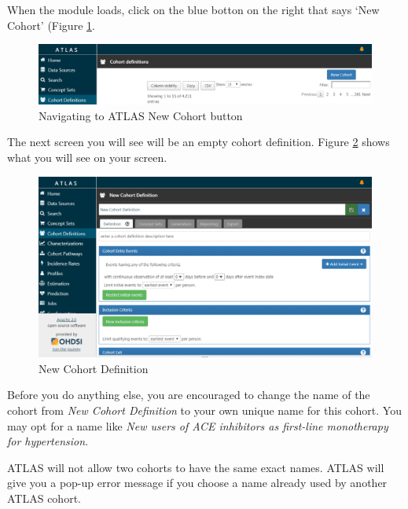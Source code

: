 \documentclass[11pt]{book}
\theoremstyle{definition}
\theoremstyle{definition}
\theoremstyle{definition}
\theoremstyle{remark}
\let\BeginKnitrBlock\begin \let\EndKnitrBlock\end
\begin{document}
When the module loads, click on the blue botton on the right that says `New Cohort' (Figure \ref{fig:ATLASnewcohort}.

\begin{figure}

{\centering \includegraphics[width=0.9\linewidth]{images/Cohorts/ATLAS-newcohort} 

}

\caption{Navigating to ATLAS New Cohort button}\label{fig:ATLASnewcohort}
\end{figure}

The next screen you will see will be an empty cohort definition. Figure \ref{fig:ATLASdefineacohort} shows what you will see on your screen.

\begin{figure}

{\centering \includegraphics[width=0.9\linewidth]{images/Cohorts/ATLAS-defineacohort} 

}

\caption{New Cohort Definition}\label{fig:ATLASdefineacohort}
\end{figure}

Before you do anything else, you are encouraged to change the name of the cohort from \emph{New Cohort Definition} to your own unique name for this cohort. You may opt for a name like \emph{New users of ACE inhibitors as first-line monotherapy for hypertension}.

\BeginKnitrBlock{rmdimportant}
ATLAS will not allow two cohorts to have the same exact names. ATLAS will give you a pop-up error message if you choose a name already used by another ATLAS cohort.
\EndKnitrBlock{rmdimportant}
\end{document}
